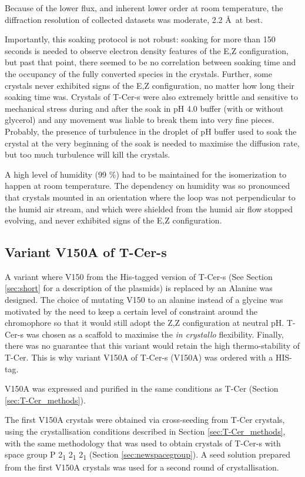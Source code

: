 Because of the lower flux, and inherent lower order at room temperature, the diffraction resolution of collected datasets was moderate, 2.2 \AA\ at best. 

Importantly, this soaking protocol is not robust: soaking for more than 150 seconds is needed to observe electron density features of the E,Z configuration, but past that point, there seemed to be no correlation between soaking time and the occupancy of the fully converted species in the crystals. Further, some crystals never exhibited signs of the E,Z configuration, no matter how long their soaking time was. Crystals of T-Cer-s were also extremely brittle and sensitive to mechanical stress during and after the soak in pH 4.0 buffer (with or without glycerol) and any movement was liable to break them into very fine pieces.  Probably, the presence of turbulence in the droplet of pH buffer used to soak the crystal at the very beginning of the soak is needed to maximise the diffusion rate, but too much turbulence will kill the crystals.

A high level of humidity (99 \%) had to be maintained for the isomerization to happen at room temperature. The dependency on humidity was so pronounced that crystals mounted in an orientation where the loop was not perpendicular to the humid air stream, and which were shielded from the humid air flow stopped evolving, and never exhibited signs of the E,Z configuration. 

\subsection{Variant V150A of T-Cer-s}

A variant where V150 from the His-tagged version of T-Cer-s (See Section \ref{sec:short} for a description of the plasmids) is replaced by an Alanine was designed. The choice of mutating V150 to an alanine instead of a glycine was motivated by the need to keep a certain level of constraint around the chromophore so that it would still adopt the Z,Z configuration at neutral pH.  T-Cer-s was chosen as a scaffold to maximise the \textit{in crystallo} flexibility. Finally, there was no guarantee that this variant would retain the high thermo-stability of T-Cer. This is why variant V150A of T-Cer-s (V150A) was ordered with a HIS-tag. 

V150A was expressed and purified in the same conditions as T-Cer (Section \ref{sec:T-Cer_methods}). 

 The first V150A crystals were obtained via cross-seeding from T-Cer crystals, using the crystallisation conditions described in Section \ref{sec:T-Cer_methods}, with the same methodology that was used to obtain crystals of T-Cer-s with space group P 2\textsubscript{1} 2\textsubscript{1} 2\textsubscript{1} (Section \ref{sec:newspacegroup}). A seed solution prepared from the first V150A crystals was used for a second round of crystallisation. 

